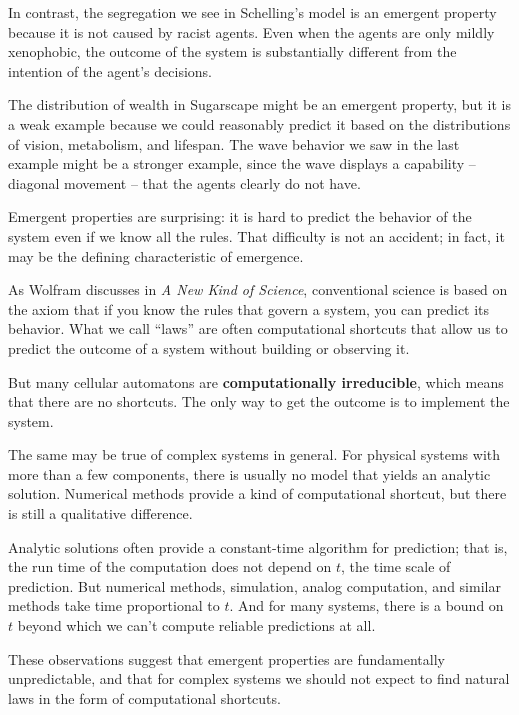 \documentclass[12pt]{book}
\theoremstyle{exercise}
\begin{document}
In contrast, the segregation we see in Schelling's model is an emergent
property because it is not caused by racist agents.  Even when the
agents are only mildly xenophobic, the outcome of the system is
substantially different from the intention of the agent's decisions.

The distribution of wealth in Sugarscape might be an emergent
property, but it is a weak example because we could
reasonably predict it based on the distributions of vision, metabolism,
and lifespan.  The wave behavior we saw in the last example might
be a stronger example, since the wave displays a capability -- diagonal
movement -- that the agents clearly do not have. 

Emergent properties are surprising: it is hard to predict the behavior
of the system even if we know all the rules.  That difficulty is not
an accident; in fact, it may be the defining characteristic of emergence.

As Wolfram discusses in {\em A New Kind of Science}, conventional science
is based on the axiom that if you know the rules that govern a system,
you can predict its behavior.  What we call ``laws'' are often
computational shortcuts that allow us to predict the outcome of a
system without building or observing it.


But many cellular automatons are {\bf computationally irreducible},
which means that there are no shortcuts.  The only way to get the
outcome is to implement the system.


The same may be true of complex systems in general.  For physical
systems with more than a few components, there is usually no model
that yields an analytic solution.  Numerical methods provide a kind of
computational shortcut, but there is still a qualitative difference.

Analytic solutions often provide a constant-time algorithm for
prediction; that is, the run time of the computation does not depend
on $t$, the time scale of prediction.  But numerical methods,
simulation, analog computation, and similar methods take time
proportional to $t$.  And for many systems, there is a bound on $t$
beyond which we can't compute reliable predictions at all.

These observations suggest that emergent properties are fundamentally
unpredictable, and that for complex systems we should not expect to
find natural laws in the form of computational shortcuts.
\end{document}
